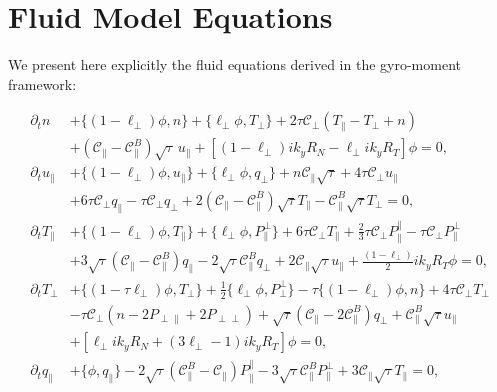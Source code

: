 \documentclass{article}
\begin{document}
\section{Fluid Model Equations}

We present here explicitly the fluid equations derived in the gyro-moment framework:

\begin{align}
\partial_t n &+ \{(1 - \ell_\perp)\phi, n\} + \{\ell_\perp \phi, T_\perp\} + 2\tau \mathcal{C}_\perp(T_\parallel - T_\perp + n) \nonumber\\
&+ (\mathcal{C}_\parallel - \mathcal{C}_\parallel^B)\sqrt{\tau}\, u_\parallel + \left[(1 - \ell_\perp)i k_y R_N - \ell_\perp i k_y R_T\right]\phi = 0,\\
\partial_t u_\parallel &+ \{(1 - \ell_\perp)\phi, u_\parallel\} + \{\ell_\perp \phi, q_\perp\} + n \mathcal{C}_\parallel\sqrt{\tau} + 4 \tau \mathcal{C}_\perp u_\parallel \nonumber\\
&+ 6\tau \mathcal{C}_\perp q_\parallel - \tau \mathcal{C}_\perp q_\perp + 2(\mathcal{C}_\parallel - \mathcal{C}_\parallel^B)\sqrt{\tau} T_\parallel - \mathcal{C}_\parallel^B\sqrt{\tau} T_\perp = 0,\\
\partial_t T_\parallel &+ \{(1 - \ell_\perp)\phi, T_\parallel\} + \{\ell_\perp \phi, P_\parallel^\perp\} + 6\tau \mathcal{C}_\perp T_\parallel + \frac{2}{3}\tau \mathcal{C}_\perp P_\parallel^\parallel - \tau \mathcal{C}_\perp P_\parallel^\perp \nonumber\\
&+ 3\sqrt{\tau}(\mathcal{C}_\parallel - \mathcal{C}_\parallel^B) q_\parallel - 2\sqrt{\tau} \mathcal{C}_\parallel^B q_\perp + 2 \mathcal{C}_\parallel\sqrt{\tau} u_\parallel + \frac{(1 - \ell_\perp)}{2}i k_y R_T \phi = 0,\\
\partial_t T_\perp &+ \{(1 - \tau \ell_\perp)\phi, T_\perp\} + \frac{1}{2}\{\ell_\perp \phi, P_\perp^\perp\} - \tau\{(1 - \ell_\perp)\phi, n\} + 4\tau \mathcal{C}_\perp T_\perp \nonumber\\
&- \tau \mathcal{C}_\perp(n - 2P_{\perp\parallel} + 2P_{\perp\perp}) + \sqrt{\tau}(\mathcal{C}_\parallel - 2\mathcal{C}_\parallel^B) q_\perp + \mathcal{C}_\parallel^B\sqrt{\tau} u_\parallel \nonumber\\
&+ \left[\ell_\perp i k_y R_N + (3\ell_\perp - 1) i k_y R_T\right]\phi = 0,\\
\partial_t q_\parallel &+ \{\phi, q_\parallel\} - 2\sqrt{\tau}(\mathcal{C}_\parallel^B - \mathcal{C}_\parallel)P_\parallel^\parallel - 3\sqrt{\tau} \mathcal{C}_\parallel^B P_\parallel^\perp + 3 \mathcal{C}_\parallel\sqrt{\tau} T_\parallel = 0,\\

\end{align}
\end{document}
